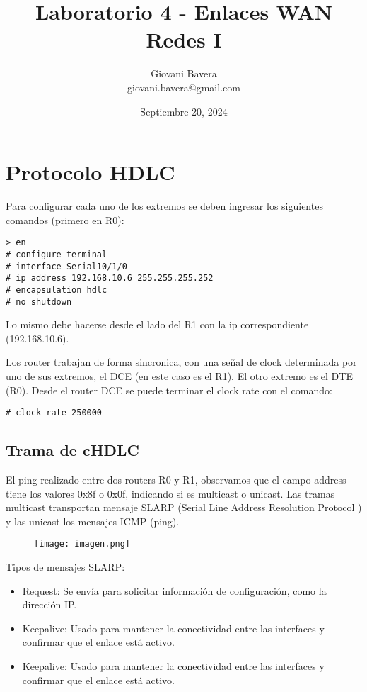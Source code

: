 \documentclass{article}
\title{Laboratorio 4 - Enlaces WAN \\ Redes I}
\author{Giovani Bavera \\ giovani.bavera@gmail.com}
\date{Septiembre 20, 2024}
\begin{document}
\maketitle

\section{Protocolo HDLC}

Para configurar cada uno de los extremos se deben ingresar los siguientes comandos (primero en R0):
\begin{verbatim}
> en
# configure terminal 
# interface Serial10/1/0 
# ip address 192.168.10.6 255.255.255.252
# encapsulation hdlc
# no shutdown
\end{verbatim}


Lo mismo debe hacerse desde el lado del R1 con la ip correspondiente (192.168.10.6).

Los router trabajan de forma sincronica, con una señal de clock determinada por uno de sus extremos, el DCE (en este caso es el R1). El otro extremo es el DTE (R0). Desde el router DCE se puede terminar el clock rate con el comando:
\begin{verbatim}
# clock rate 250000
\end{verbatim}

\subsection{Trama de cHDLC}

El ping realizado entre dos routers R0 y R1, observamos que el campo address tiene los valores 0x8f o 0x0f, indicando si es multicast o unicast. 
Las tramas multicast transportan mensaje SLARP (Serial Line Address Resolution Protocol ) y las unicast los mensajes ICMP (ping).

\begin{figure}[H]
    \centering
    \texttt{[image: imagen.png]}
    \label{fig:enter-label}
\end{figure}

Tipos de mensajes SLARP:
\begin{itemize}
    \item Request: Se envía para solicitar información de configuración, como la dirección IP.
    \item Keepalive: Usado para mantener la conectividad entre las interfaces y confirmar que el enlace está activo.
    \item Keepalive: Usado para mantener la conectividad entre las interfaces y confirmar que el enlace está activo.
\end{itemize}
\end{document}
